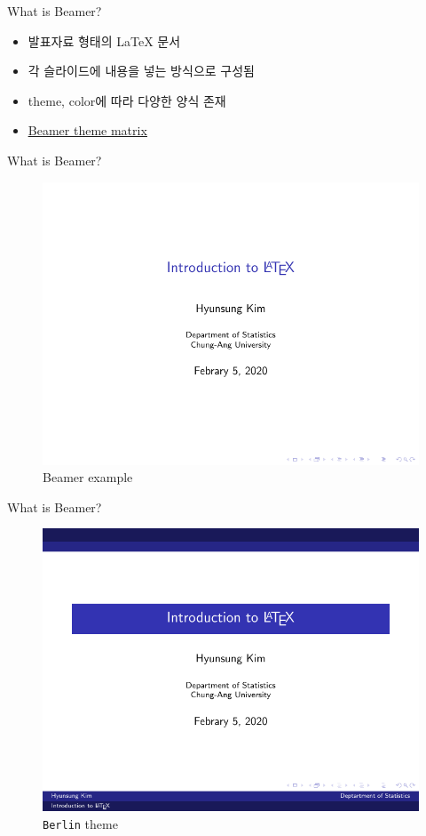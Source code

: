 \documentclass{beamer}
\begin{document}
\begin{frame}{What is Beamer?}
	\begin{itemize}
		\item {
			발표자료 형태의 \textrm{\LaTeX} 문서
		}
		\item {
			각 슬라이드에 내용을 넣는 방식으로 구성됨
		}
		\item {
			theme, color에 따라 다양한 양식 존재
		}	
		\item {
			\href{https://hartwork.org/beamer-theme-matrix/}{\underline{Beamer theme matrix}}
		}	
	\end{itemize}
\end{frame}

\begin{frame}{What is Beamer?}
	\begin{figure}[h] %
		\begin{center}
			\includegraphics[width=0.7\linewidth]{img/beamer_1.pdf}
		\end{center}
		\caption{Beamer example}
		\label{fig:long}
		\label{fig:onecol}
	\end{figure}
\end{frame}

\begin{frame}{What is Beamer?}
	\begin{figure}[h] %
		\begin{center}
			\includegraphics[width=0.7\linewidth]{img/beamer_2.pdf}
		\end{center}
		\caption{\texttt{Berlin} theme}
		\label{fig:long}
		\label{fig:onecol}
	\end{figure}
\end{frame}
\end{document}
